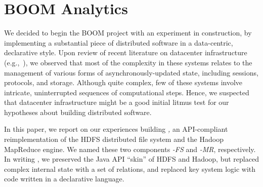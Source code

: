 \chapter[BOOM Analytics]{BOOM Analytics}
\label{ch:boom}

We decided to begin the BOOM project with an experiment in construction, by implementing a substantial piece of
distributed software in a data-centric, declarative style. Upon review of recent literature on
datacenter infrastructure (e.g.,~\cite{chubby,gfs-sosp,dynamo,mapreduce-osdi}),
we observed that most of the complexity in these systems relates to the
management of various forms of asynchronously-updated state, including sessions,
protocols, and storage. Although quite complex, few of these systems involve intricate, uninterrupted
sequences of computational steps. Hence, we suspected that datacenter
infrastructure might be a good initial litmus test for our hypotheses about building distributed software.

In this paper, we report on our experiences building \emph{\BOOMA,} an
API-compliant reimplementation of the HDFS distributed file system and the
Hadoop MapReduce engine.  We named these two
components \emph{\BOOM-FS} and \emph{\BOOM-MR}, respectively. In writing \BOOMA,
we preserved the Java API ``skin'' of HDFS and Hadoop, but replaced complex
internal state with a set of relations, and replaced key system
logic with code written in a declarative language.

